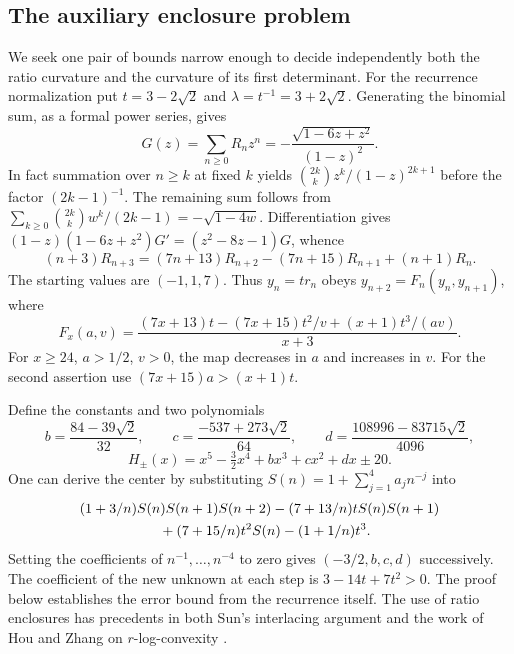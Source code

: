\documentclass[11pt,a4paper]{article}
\theoremstyle{definition}\newtheorem{problem}[theorem]{Problem}
\begin{document}
\subsection{The auxiliary enclosure problem}
We seek one pair of bounds narrow enough to decide independently both
the ratio curvature and the curvature of its first determinant.
For the recurrence normalization put
$t=3-2\sqrt2$ and $\lambda=t^{-1}=3+2\sqrt2$.
Generating the binomial sum, as a formal power series, gives
\[
 G(z)=\sum_{n\ge0}R_nz^n
     =-\frac{\sqrt{1-6z+z^2}}{(1-z)^2}.
\]
In fact summation over $n\ge k$ at fixed $k$ yields
$\binom{2k}k z^k/(1-z)^{2k+1}$ before the factor $(2k-1)^{-1}$.
The remaining sum follows from
$\sum_{k\ge0}\binom{2k}k w^k/(2k-1)=-\sqrt{1-4w}$.
Differentiation gives
$(1-z)(1-6z+z^2)G'=(z^2-8z-1)G$, whence
\[
 (n+3)R_{n+3}=(7n+13)R_{n+2}-(7n+15)R_{n+1}+(n+1)R_n.
\]
The starting values are $(-1,1,7)$. Thus $y_n=t r_n$ obeys
$y_{n+2}=F_n(y_n,y_{n+1})$, where
\[
 F_x(a,v)=\frac{(7x+13)t-(7x+15)t^2/v+(x+1)t^3/(av)}{x+3}.
\]
For $x\ge24$, $a>1/2$, $v>0$, the map decreases in $a$ and
increases in $v$. For the second assertion use
$(7x+15)a>(x+1)t$.

Define the constants and two polynomials
\[
 b=\frac{84-39\sqrt2}{32},\qquad
 c=\frac{-537+273\sqrt2}{64},\qquad
 d=\frac{108996-83715\sqrt2}{4096},
\]
\[
 H_\pm(x)=x^5-\tfrac32x^4+b x^3+c x^2+d x\pm20.
\]
One can derive the center by substituting
$S(n)=1+\sum_{j=1}^4a_j n^{-j}$ into
\begin{align*}
 &(1+3/n) S(n)S(n+1)S(n+2)-(7+13/n)t S(n)S(n+1)\\
 &\hspace{20mm}+(7+15/n)t^2 S(n)-(1+1/n)t^3 .
\end{align*}
Setting the coefficients of $n^{-1},\ldots,n^{-4}$ to zero gives
$(-3/2,b,c,d)$ successively. The coefficient of the new unknown at
each step is $3-14t+7t^2>0$. The proof below establishes the error
bound from the recurrence itself. The use of ratio enclosures has
precedents in both Sun's interlacing argument and the work of
Hou and Zhang on $r$-log-convexity \cite{bysun,houzhang}.
\end{document}
